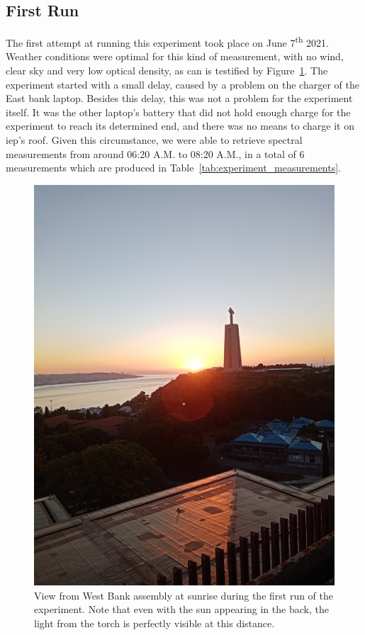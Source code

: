 \subsection{First Run}%
\label{sub:experiment_first_run}

The first attempt at running this experiment took place on June
7\textsuperscript{th} 2021. Weather conditions were optimal for this
kind of measurement, with no wind, clear sky and very low optical
density, as can is testified by Figure~\ref{fig:light_at_the_distance}.
The experiment started with a small delay, caused by a problem on the
charger of the East bank laptop. Besides this delay, this was not a
problem for the experiment itself. It was the other laptop's battery
that did not hold enough charge for the experiment to reach its
determined end, and there was no means to charge it on \gls{iep}'s roof.
Given this circumstance, we were able to retrieve spectral measurements
from around 06:20 A.M. to 08:20 A.M., in a total of 6 measurements which
are produced in Table~\ref{tab:experiment_measurements}.

\begin{figure}[htpb]
    \centering
    \includegraphics[width=0.8\linewidth]{img/jpg/experiment1/light_at_the_distance1.jpg}
    \caption{View from West Bank assembly at sunrise during the first
    run of the experiment. Note that even with the sun appearing in the
    back, the light from the torch is perfectly visible at this distance.}
    \label{fig:light_at_the_distance}
\end{figure}


